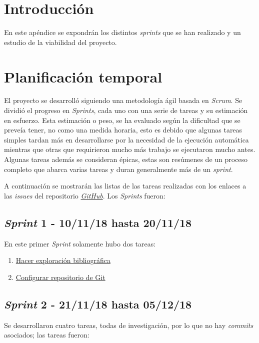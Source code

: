 
\section{Introducción}

En este apéndice se expondrán los distintos \textit{sprints} que se han realizado y un estudio de la viabilidad del proyecto.

\section{Planificación temporal}

El proyecto se desarrolló siguiendo una metodología ágil basada en \textit{Scrum}. Se dividió el progreso en \textit{Sprints}, cada uno con una serie de tareas y su estimación en esfuerzo. Esta estimación o peso, se ha evaluado según la dificultad que se preveía tener, no como una medida horaria, esto es debido que algunas tareas simples tardan más en desarrollarse por la necesidad de la ejecución automática mientras que otras que requirieron mucho más trabajo se ejecutaron mucho antes. Algunas tareas además se consideran épicas, estas son resúmenes de un proceso completo que abarca varias tareas y duran generalmente más de un \textit{sprint}. 

A continuación se mostrarán las listas de las tareas realizadas con los enlaces a las \textit{issues} del repositorio \textit{\href{https://github.com/jlgarridol/TFG-SmartBeds}{GitHub}}. Los \textit{Sprints} fueron:
\subsection{\textit{Sprint} 1 - 10/11/18 hasta 20/11/18}
En este primer \textit{Sprint} solamente hubo dos tareas:
\begin{enumerate}
	\item \href{https://github.com/joselucross/TFG-SmartBeds/issues/1}{Hacer exploración bibliográfica}
	\item \href{https://github.com/joselucross/TFG-SmartBeds/issues/2}{Configurar repositorio de Git}
\end{enumerate}
\subsection{\textit{Sprint} 2 - 21/11/18 hasta 05/12/18}
Se desarrollaron cuatro tareas, todas de investigación, por lo que no hay \textit{commits} asociados; las tareas fueron:

